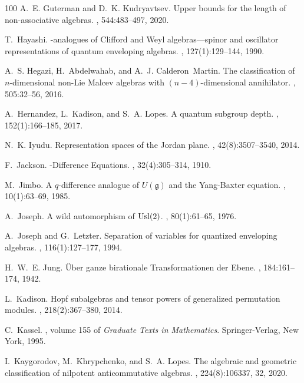\documentclass{commat}
\begin{document}
\begin{thebibliography}{100}
A.~E. Guterman and D.~K. Kudryavtsev.
\newblock Upper bounds for the length of non-associative algebras.
, 544:483--497, 2020.

T.~Hayashi.
-analogues of {C}lifford and {W}eyl algebras---spinor and
  oscillator representations of quantum enveloping algebras.
, 127(1):129--144, 1990.

A.~S. Hegazi, H.~Abdelwahab, and A.~J. Calderon~Martin.
\newblock The classification of {$n$}-dimensional non-{L}ie {M}alcev algebras
  with {$(n-4)$}-dimensional annihilator.
, 505:32--56, 2016.

A.~Hernandez, L.~Kadison, and S.~A. Lopes.
\newblock A quantum subgroup depth.
, 152(1):166--185, 2017.

N.~K. Iyudu.
\newblock Representation spaces of the {J}ordan plane.
, 42(8):3507--3540, 2014.

F.~Jackson.
-{D}ifference {E}quations.
, 32(4):305--314, 1910.

M.~Jimbo.
\newblock A {$q$}-difference analogue of {$U({\mathfrak g})$} and the
  {Y}ang-{B}axter equation.
, 10(1):63--69, 1985.

A.~Joseph.
\newblock A wild automorphism of {${\rm Usl}(2)$}.
, 80(1):61--65, 1976.

A.~Joseph and G.~Letzter.
\newblock Separation of variables for quantized enveloping algebras.
, 116(1):127--177, 1994.

H.~W.~E. Jung.
\newblock \"{U}ber ganze birationale {T}ransformationen der {E}bene.
, 184:161--174, 1942.

L.~Kadison.
\newblock Hopf subalgebras and tensor powers of generalized permutation
  modules.
, 218(2):367--380, 2014.

C.~Kassel.
, volume 155 of {\em Graduate Texts in
  Mathematics}.
\newblock Springer-Verlag, New York, 1995.

I.~Kaygorodov, M.~Khrypchenko, and S.~A. Lopes.
\newblock The algebraic and geometric classification of nilpotent
  anticommutative algebras.
, 224(8):106337, 32, 2020.


\end{thebibliography}
\end{document}
